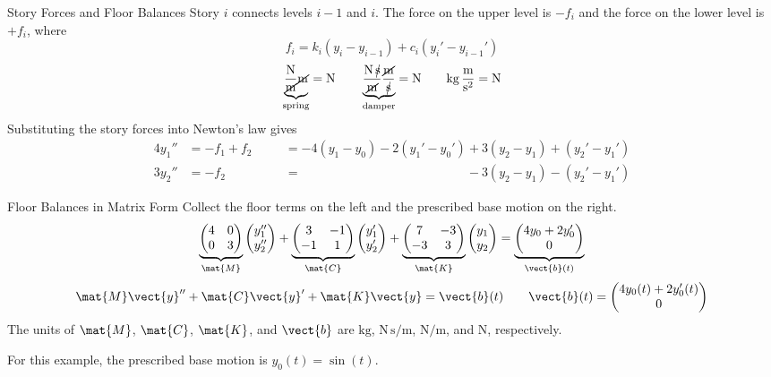 \documentclass[11pt,aspectratio=169]{beamer}
\begin{document}
\begin{frame}{Story Forces and Floor Balances}
\setlength{\abovedisplayskip}{5pt}
\setlength{\belowdisplayskip}{5pt}
\setlength{\abovedisplayshortskip}{5pt}
\setlength{\belowdisplayshortskip}{5pt}
Story $i$ connects levels $i-1$ and $i$. The force on the 
upper level is
$-f_i$ and the force on the lower level is $+f_i$, where
\[
  f_i=k_i(y_i-y_{i-1})+c_i(y_i'-y_{i-1}')
\]
\[
  \underbrace{\frac{\mathrm{N}}{\cancel{\mathrm{m}}}
    \cancel{\mathrm{m}}}_{\text{spring}}=\mathrm{N}
  \qquad
  \underbrace{\frac{\mathrm{N}\,\cancel{\mathrm{s}}}{\cancel{\mathrm{m}}}
    \frac{\cancel{\mathrm{m}}}{\cancel{\mathrm{s}}}}_{\text{damper}}=\mathrm{N}
  \qquad
  \mathrm{kg}\,\frac{\mathrm{m}}{\mathrm{s}^2}=\mathrm{N}
\]
Substituting the story forces into Newton's law gives
\[
  \begin{alignedat}{2}
    4y_1'' &=-f_1+f_2 &\quad
      &=-4(y_1-y_0)-2(y_1'-y_0')+3(y_2-y_1)+(y_2'-y_1')\\
    3y_2'' &=-f_2 &
      &=\phantom{-4(y_1-y_0)-2(y_1'-y_0')}-3(y_2-y_1)-(y_2'-y_1')
  \end{alignedat}
\]
\end{frame}

\begin{frame}{Floor Balances in Matrix Form}
Collect the floor terms on the left and the prescribed base motion on the right.
\[
  \underbrace{\begin{pmatrix}4&0\\0&3\end{pmatrix}}_{\mat{M}}
    \begin{pmatrix}y_1''\\y_2''\end{pmatrix}
  +\underbrace{\begin{pmatrix}3&-1\\-1&1\end{pmatrix}}_{\mat{C}}
    \begin{pmatrix}y_1'\\y_2'\end{pmatrix}
  +\underbrace{\begin{pmatrix}7&-3\\-3&3\end{pmatrix}}_{\mat{K}}
    \begin{pmatrix}y_1\\y_2\end{pmatrix}
  =\underbrace{\begin{pmatrix}4y_0+2y_0'\\0\end{pmatrix}}_{\vect{b}(t)}
\]
\[
  \mat{M}\vect{y}''+\mat{C}\vect{y}'+\mat{K}\vect{y}=\vect{b}(t)
  \qquad
  \vect{b}(t)=\begin{pmatrix}4y_0(t)+2y_0'(t)\\0\end{pmatrix}
\]
The units of $\mat{M}$, $\mat{C}$, $\mat{K}$, and $\vect{b}$ are
$\mathrm{kg}$, $\mathrm{N\,s/m}$, $\mathrm{N/m}$, and $\mathrm{N}$, respectively.

\medskip
For this example, the prescribed base motion is $y_0(t)=\sin(t)$.
\end{frame}
\end{document}
